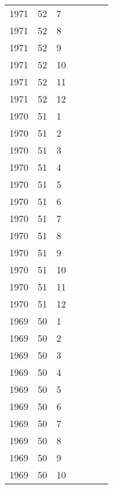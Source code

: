 \begin{longtable}{ |l|l|l|l|p{2.7cm}|l|p{2cm}| }
 1971 & 52 &     7 &         &                &  & \\
 1971 & 52 &     8 &         &                &  & \\
 1971 & 52 &     9 &         &                &  & \\
 1971 & 52 &    10 &         &                &  & \\
 1971 & 52 &    11 &         &                &  & \\
 1971 & 52 &    12 &         &                &  & \\
 1970 & 51 &     1 &         &                &  & \\
 1970 & 51 &     2 &         &                &  & \\
 1970 & 51 &     3 &         &                &  & \\
 1970 & 51 &     4 &         &                &  & \\
 1970 & 51 &     5 &         &                &  & \\
 1970 & 51 &     6 &         &                &  & \\
 1970 & 51 &     7 &         &                &  & \\
 1970 & 51 &     8 &         &                &  & \\
 1970 & 51 &     9 &         &                &  & \\
 1970 & 51 &    10 &         &                &  & \\
 1970 & 51 &    11 &         &                &  & \\
 1970 & 51 &    12 &         &                &  & \\
 1969 & 50 &     1 &         &                &  & \\
 1969 & 50 &     2 &         &                &  & \\
 1969 & 50 &     3 &         &                &  & \\
 1969 & 50 &     4 &         &                &  & \\
 1969 & 50 &     5 &         &                &  & \\
 1969 & 50 &     6 &         &                &  & \\
 1969 & 50 &     7 &         &                &  & \\
 1969 & 50 &     8 &         &                &  & \\
 1969 & 50 &     9 &         &                &  & \\
 1969 & 50 &    10 &         &                &  & \\

\end{longtable}
